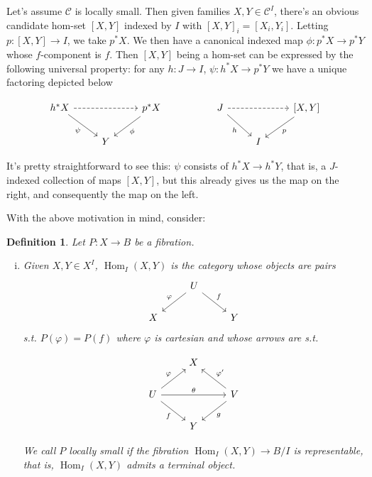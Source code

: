 \documentclass[10pt, oneside]{article}
\newtheorem{definition}[theorem]{Definition}
\begin{document}
Let's assume $\mathcal{C}$ is locally small. Then given families $X, Y \in \mathcal{C}^I$, there's an obvious candidate hom-set $[X, Y]$ indexed by $I$ with $[X, Y]_i = [X_i, Y_i]$. Letting $p: [X, Y] \to I$, we take $p^\ast X$. We then have a canonical indexed map $\phi: p^\ast X \to p^\ast Y$ whose $f$-component is $f$. Then $[X, Y]$ being a hom-set can be expressed by the following universal property: for any $h: J \to I$, $\psi: h^\ast X \to p^\ast Y$ we have a unique factoring depicted below

\[\begin{tikzcd}[ampersand replacement=\&]
	{h^\ast X} \&\& {p^\ast X} \&\& J \&\& {[X, Y]} \\
	\& Y \&\&\&\& I
	\arrow[dashed, from=1-1, to=1-3]
	\arrow["\psi"', from=1-1, to=2-2]
	\arrow["\phi", from=1-3, to=2-2]
	\arrow["h"', from=1-5, to=2-6]
	\arrow["p", from=1-7, to=2-6]
	\arrow[dashed, from=1-5, to=1-7]
\end{tikzcd}\]

It's pretty straightforward to see this: $\psi$ consists of $h^\ast X \to h^\ast Y$, that is, a $J$-indexed collection of maps $[X, Y]$, but this already gives us the map on the right, and consequently the map on the left.

With the above motivation in mind, consider:

\begin{definition}
Let $P: X \to B$ be a fibration.

\begin{enumerate}[i)]
    \item Given $X, Y \in X^I$, $\operatorname{Hom}_I{(X, Y)}$ is the category whose objects are pairs
    \[\begin{tikzcd}[ampersand replacement=\&]
    	\& U \\
    	X \&\& Y
    	\arrow["\varphi"', from=1-2, to=2-1]
    	\arrow["f", from=1-2, to=2-3]
    \end{tikzcd}\]
    \noindent s.t. $P(\varphi) = P(f)$ where $\varphi$ is cartesian and whose arrows are s.t.

    \[\begin{tikzcd}[ampersand replacement=\&]
	\& X \\
	U \&\& V \\
	\& Y
	\arrow["\varphi", from=2-1, to=1-2]
	\arrow["f"', from=2-1, to=3-2]
	\arrow["{\varphi^\prime}"', from=2-3, to=1-2]
	\arrow["g", from=2-3, to=3-2]
	\arrow["\theta", from=2-1, to=2-3]
    \end{tikzcd}\]

    We call $P$ locally small if the fibration $\operatorname{Hom}_I{(X, Y)} \to B/I$ is representable, that is, $\operatorname{Hom}_I{(X, Y)}$ admits a terminal object.
\end{enumerate}
\end{definition}
\end{document}
